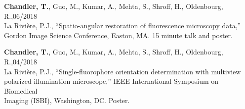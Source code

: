 \documentclass[12pt,letterpaper]{article}
\begin{document}
\begin{benumerate}{8}
\item {\textbf{Chandler, T.}, Guo, M., Kumar, A., Mehta, S., Shroff, H., Oldenbourg, R.,\hfill 06/2018\\ La Rivi\`ere, P.J., ``Spatio-angular restoration of fluorescence microscopy data,''\\
      Gordon Image Science Conference, Easton, MA. 15 minute talk and poster.}

\item {\textbf{Chandler, T.}, Guo, M., Kumar, A., Mehta, S., Shroff, H., Oldenbourg, R.,\hfill 04/2018\\ La Rivi\`ere, P.J., ``Single-fluorophore orientation determination with multiview\\ polarized
      illumination microscope,'' IEEE International Symposium on Biomedical\\ Imaging (ISBI), Washington, DC. Poster.}
\end{benumerate}
\end{document}
